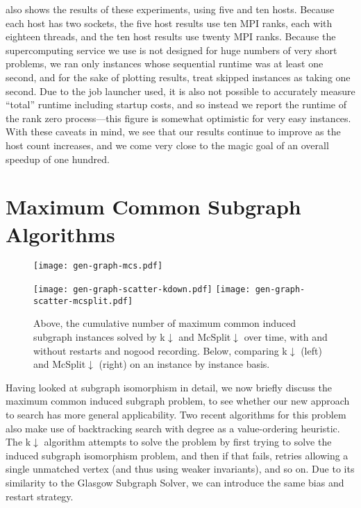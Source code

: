 \documentclass[runningheads]{llncs}
\begin{document}
 also shows the results of these experiments, using five and ten hosts.
Because each host has two sockets, the five host results use ten MPI ranks, each with eighteen
threads, and the ten host results use twenty MPI ranks. Because the supercomputing service we use is
not designed for huge numbers of very short problems, we ran only instances whose sequential runtime
was at least one second, and for the sake of plotting results, treat skipped instances as taking one
second. Due to the job launcher used, it is also not possible to accurately measure ``total''
runtime including startup costs, and so instead we report the runtime of the rank zero
process---this figure is somewhat optimistic for very easy instances. With these caveats in mind, we
see that our results continue to improve as the host count increases, and we come very close to the
magic goal of an overall speedup of one hundred.

\section{Maximum Common Subgraph Algorithms}

\begin{figure}[tb]
    \texttt{[image: gen-graph-mcs.pdf]}

    \medskip

    \texttt{[image: gen-graph-scatter-kdown.pdf]}
    \hfill
    \texttt{[image: gen-graph-scatter-mcsplit.pdf]}

    \caption{Above, the cumulative number of maximum common induced subgraph instances solved by
    k${\downarrow}$ and McSplit${\downarrow}$ over time, with and without restarts and nogood
    recording. Below, comparing k${\downarrow}$ (left) and McSplit${\downarrow}$ (right) on an instance by instance
    basis.}\label{figure:mcs}
\end{figure}

Having looked at subgraph isomorphism in detail, we now briefly discuss the maximum common induced
subgraph problem, to see whether our new approach to search has more general applicability.  Two
recent algorithms for this problem also make use of backtracking search with degree as a
value-ordering heuristic. The k${\downarrow}$ algorithm \cite{DBLP:conf/aaai/HoffmannMR17} attempts
to solve the problem by first trying to solve the induced subgraph isomorphism problem, and then if
that fails, retries allowing a single unmatched vertex (and thus using weaker invariants), and so
on. Due to its similarity to the Glasgow Subgraph Solver, we can introduce the same bias and restart
strategy.
\end{document}
